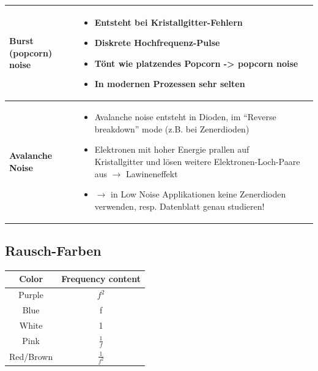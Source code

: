 \begin{longtable}{|l|l|l|}
\hline
\begin{minipage}{4cm}
\textbf{Burst (popcorn) noise}
\end{minipage}
&
\begin{minipage}{6cm}
\begin{itemize}
  \item Entsteht bei Kristallgitter-Fehlern
  \item Diskrete Hochfrequenz-Pulse
  \item Tönt wie platzendes Popcorn -> popcorn noise
  \item In modernen Prozessen sehr selten
\end{itemize}
\end{minipage}
&\\
\hline
\begin{minipage}{4cm}
\textbf{Avalanche Noise}
\end{minipage}
&
\begin{minipage}{6cm}
\begin{itemize}
  \item Avalanche noise entsteht in Dioden, im “Reverse breakdown” mode (z.B.
  bei Zenerdioden)
  \item Elektronen mit hoher Energie prallen auf Kristallgitter und lösen
  weitere Elektronen-Loch-Paare aus $\to$ Lawineneffekt
  \item $\to$ in Low Noise Applikationen keine Zenerdioden verwenden, resp.
  Datenblatt genau studieren!
\end{itemize}
\end{minipage}
&\\
\hline

\end{longtable}

\subsection{Rausch-Farben}
\begin{tabular}{|c|c|}
\hline
\textbf{Color}&\textbf{Frequency content}\\\hline
Purple&$f^2$\\\hline
Blue&f\\\hline
White&1\\\hline
Pink&$\frac{1}{f}$\\\hline
Red/Brown&$\frac{1}{f^2}$\\\hline
\end{tabular}

